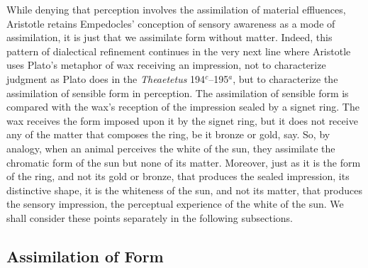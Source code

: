 While denying that perception involves the assimilation of material effluences, Aristotle retains Empedocles' conception of sensory awareness as a mode of assimilation, it is just that we assimilate form without matter. Indeed, this pattern of dialectical refinement continues in the very next line where Aristotle uses Plato's metaphor of wax receiving an impression, not to characterize judgment as Plato does in the \emph{Theaetetus} 194\( ^{c} \)--195\( ^{a} \), but to characterize the assimilation of sensible form in perception. The assimilation of sensible form is compared with the wax's reception of the impression sealed by a signet ring. The wax receives the form imposed upon it by the signet ring, but it does not receive any of the matter that composes the ring, be it bronze or gold, say. So, by analogy, when an animal perceives the white of the sun, they assimilate the chromatic form of the sun but none of its matter. Moreover, just as it is the form of the ring, and not its gold or bronze, that produces the sealed impression, its distinctive shape, it is the whiteness of the sun, and not its matter, that produces the sensory impression, the perceptual experience of the white of the sun. We shall consider these points separately in the following subsections.

\subsection{Assimilation of Form} %
\label{sub:assimilation_of_form}


